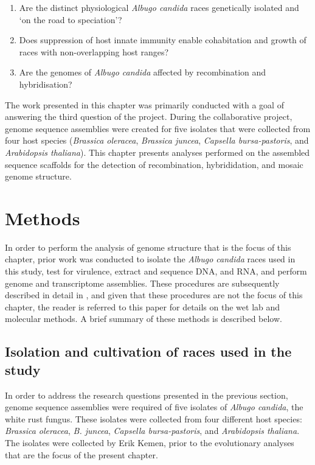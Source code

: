 \begin{enumerate}
\item Are the distinct physiological \textit{Albugo candida} races genetically isolated and ‘on the road to speciation’?
\item Does suppression of host innate immunity enable cohabitation and growth of races with non-overlapping host ranges?
\item Are the genomes of \textit{Albugo candida} affected by recombination and hybridisation?
\end{enumerate}

The work presented in this chapter was primarily conducted with a goal of answering the third question of the project. During the collaborative project, genome sequence assemblies were created for five isolates that were collected from four host species (\textit{Brassica oleracea}, \textit{Brassica juncea}, \textit{Capsella bursa-pastoris}, and \textit{Arabidopsis thaliana}). This chapter presents analyses performed on the assembled sequence scaffolds for the detection of recombination, hybrididation, and mosaic genome structure.


\section{Methods}
In order to perform the analysis of genome structure that is the focus of this chapter, prior work was conducted to isolate the \textit{Albugo candida} races used in this study, test for virulence, extract and sequence DNA, and RNA, and perform genome and transcriptome assemblies. These procedures are subsequently described in detail in \parencite{McMullan2015a}, and given that these procedures are not the focus of this chapter, the reader is referred to this paper for details on the wet lab and molecular methods. A brief summary of these methods is described below.

\subsection{Isolation and cultivation of races used in the study}
In order to address the research questions presented in the previous section, genome sequence assemblies were required of five isolates of \textit{Albugo candida}, the white rust fungus. These isolates were collected from four different host species: \textit{Brassica oleracea}, \textit{B. juncea}, \textit{Capsella bursa-pastoris}, and \textit{Arabidopsis thaliana}. The isolates were collected by Erik Kemen, prior to the evolutionary analyses that are the focus of the present chapter. 

